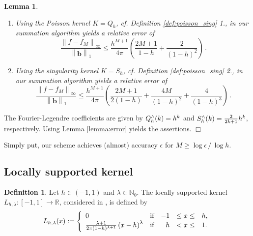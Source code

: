 \documentclass[11pt,a4paper,twoside,bibtotoc]{scrartcl}
\theoremstyle{plain}
\newtheorem{lemma}[theorem]{Lemma}
\theoremstyle{definition}
\newtheorem{definition}[theorem]{Definition}
\theoremstyle{remark}
\newenvironment{proof}{{\bf Proof.}}{$\Box$}
\newcommand{\NZ}{\ensuremath{\mathbb{N}_{0}}}
\newcommand{\R}{\ensuremath{\mathbb{R}}}
\newcommand{\interv}[4]{\ensuremath{\left#1\left.#2,#3\right#4\right.}}
\newcommand{\fun}[2]{\ensuremath{#1{\hspace{-0.4ex}}\left(#2\right)}}
\newcommand{\paren}[1]{\ensuremath{\left(#1\right)}}
\newcommand{\mb}[1]{\mathbf{#1}}
\newcommand{\V}[1]{\mb{#1}}
\numberwithin{equation}{section}
\numberwithin{table}{section}
\numberwithin{figure}{section}
\begin{document}
\begin{lemma}
  ${}^{}$\\[-2ex]
 \begin{enumerate}
   \item 
Using the Poisson kernel $K=Q_h$, cf. Definition \ref{def:poisson_sing} 1.,
in our summation algorithm yields a relative error of
     \begin{equation}
       \label{error:poisson}
       \frac{\left\|f - f_{M}\right\|_{\infty}}{\left\|\V{b}\right\|_1} \le
       \frac{h^{M+1}}{4\pi}
       \left(\frac{2M+1}{1-h}+\frac{2}{\left(1-h\right)^2}\right)\, .
     \end{equation}
     \item 
Using the singularity kernel $K=S_h$, cf. Definition \ref{def:poisson_sing}
2., in our summation algorithm yields a relative error of 
       \begin{equation}
         \label{error:singular}
         \frac{\left\|f - f_{M}\right\|_{\infty}}{\left\|\V{b}\right\|_1} \le
         \frac{h^{M+1}}{4\pi} \left(\frac{2M+1}{2\left(1-h\right)}+
           \frac{4M}{\left(1-h\right)^2}+
         \frac{4}{\left(1-h\right)^3}\right)\, .
       \end{equation}
 \end{enumerate}
\end{lemma}
\begin{proof}
The Fourier-Legendre coefficients are given by $\fun{Q_{h}^{\wedge}}{k}=h^k$ and
$\fun{S_{h}^{\wedge}}{k}=\frac{2}{2k+1}h^k$, respectively.
Using Lemma \ref{lemma:error} yields the assertions.
\end{proof}
  
Simply put, our scheme achieves (almost) accuracy $\epsilon$ for $M \ge \log\epsilon \,
/ \, \log h$.

\subsection{Locally supported kernel}
\begin{definition}
  Let $h \in \interv{(}{-1}{1}{)}$ and $\lambda \in \NZ$.
  The locally supported kernel
    $L_{h,\lambda}:\interv{[}{-1}{1}{]} \rightarrow \R$, considered in
    \cite{Sc97}, is defined by
    \[
    \fun{L_{h,\lambda}}{x} := 
    \left\{\begin{array}{l@{\quad \text{if} \quad}rcl} 
        0 & -1 &\le x \le& h, \\
        \frac{\lambda+1}{2\pi(1-h)^{\lambda+1}}\paren{x-h}^{\lambda} &  h & <  x \le& 1.
      \end{array}\right.
    \]
\end{definition}
\end{document}
